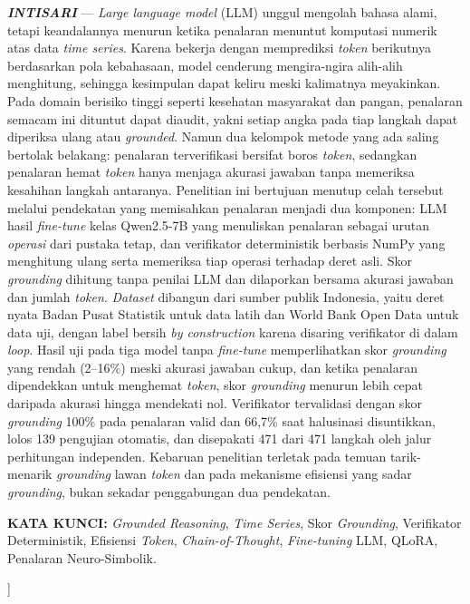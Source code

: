 \documentclass[10pt,a4paper,twocolumn]{article}
\begin{document}
{\begin{@twocolumnfalse}
{\small\justifying
\noindent\textbf{\textit{INTISARI}} --- \textit{Large language model} (LLM)
unggul mengolah bahasa alami, tetapi keandalannya menurun ketika penalaran
menuntut komputasi numerik atas data \textit{time series}. Karena bekerja dengan
memprediksi \textit{token} berikutnya berdasarkan pola kebahasaan, model
cenderung mengira-ngira alih-alih menghitung, sehingga kesimpulan dapat keliru
meski kalimatnya meyakinkan. Pada domain berisiko tinggi seperti kesehatan
masyarakat dan pangan, penalaran semacam ini dituntut dapat diaudit, yakni setiap
angka pada tiap langkah dapat diperiksa ulang atau \textit{grounded}. Namun dua
kelompok metode yang ada saling bertolak belakang: penalaran terverifikasi
bersifat boros \textit{token}, sedangkan penalaran hemat \textit{token} hanya
menjaga akurasi jawaban tanpa memeriksa kesahihan langkah antaranya. Penelitian
ini bertujuan menutup celah tersebut melalui pendekatan yang memisahkan penalaran
menjadi dua komponen: LLM hasil \textit{fine-tune} kelas Qwen2.5-7B yang
menuliskan penalaran sebagai urutan \textit{operasi} dari pustaka tetap, dan
verifikator deterministik berbasis NumPy yang menghitung ulang serta memeriksa
tiap operasi terhadap deret asli. Skor \textit{grounding} dihitung tanpa penilai
LLM dan dilaporkan bersama akurasi jawaban dan jumlah \textit{token}.
\textit{Dataset} dibangun dari sumber publik Indonesia, yaitu deret nyata Badan
Pusat Statistik untuk data latih dan World Bank Open Data untuk data uji, dengan
label bersih \textit{by construction} karena disaring verifikator di dalam
\textit{loop}. Hasil uji pada tiga model tanpa \textit{fine-tune} memperlihatkan
skor \textit{grounding} yang rendah (2--16\%) meski akurasi jawaban cukup, dan
ketika penalaran dipendekkan untuk menghemat \textit{token}, skor
\textit{grounding} menurun lebih cepat daripada akurasi hingga mendekati nol.
Verifikator tervalidasi dengan skor \textit{grounding} 100\% pada penalaran valid
dan 66,7\% saat halusinasi disuntikkan, lolos 139 pengujian otomatis, dan
disepakati 471 dari 471 langkah oleh jalur perhitungan independen. Kebaruan
penelitian terletak pada temuan tarik-menarik \textit{grounding} lawan
\textit{token} dan pada mekanisme efisiensi yang sadar \textit{grounding}, bukan
sekadar penggabungan dua pendekatan.
\par\vspace{0.7em}
\noindent\textbf{KATA KUNCI:} \textit{Grounded Reasoning}, \textit{Time Series},
Skor \textit{Grounding}, Verifikator Deterministik, Efisiensi \textit{Token},
\textit{Chain-of-Thought}, \textit{Fine-tuning} LLM, QLoRA, Penalaran
Neuro-Simbolik.
\par}
\vspace{1.5em}
\end{@twocolumnfalse}
}]
\end{document}
